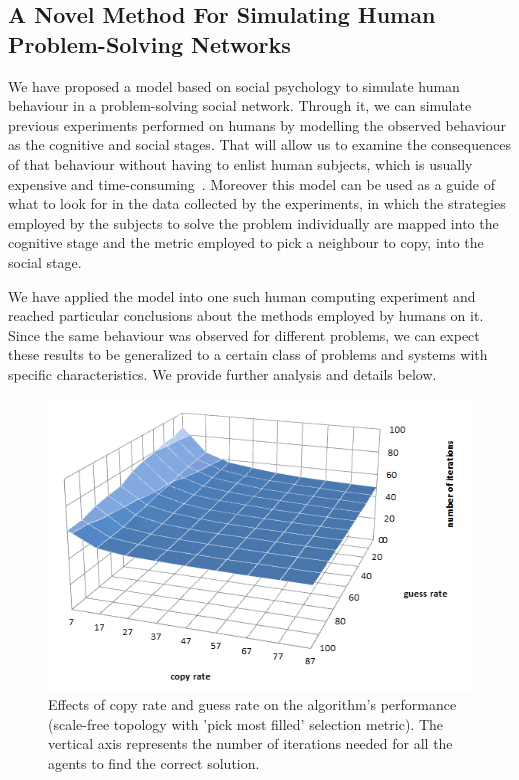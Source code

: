 \documentclass{article}
\begin{document}
\subsection{A Novel Method For Simulating Human Problem-Solving Networks}

We have proposed a model based on social psychology to simulate human behaviour in a problem-solving social network. Through it, we can simulate previous experiments performed on humans by modelling the observed behaviour as the cognitive and social stages. That will allow us to examine the consequences of that behaviour without having to enlist human subjects, which is usually expensive and time-consuming~\cite{?}. Moreover this model can be used as a guide of what to look for in the data collected by the experiments, in which the strategies employed by the subjects to solve the problem individually are mapped into the cognitive stage and the metric employed to pick a neighbour to copy, into the social stage.

We have applied the model into one such human computing experiment and reached particular conclusions about the methods employed by humans on it. Since the same behaviour was observed for different problems, we can expect these results to be generalized to a certain class of problems and systems with specific characteristics. We provide further analysis and details below.

\begin{figure}
\includegraphics[scale=0.60]{copy_guess_free_most}
\caption{Effects of copy rate and guess rate on the algorithm's performance (scale-free topology with 'pick most filled' selection metric). The vertical axis represents the number of iterations needed for all the agents to find the correct solution.
}
\label{fig:copy_guess_free_most}
\end{figure}
\end{document}
